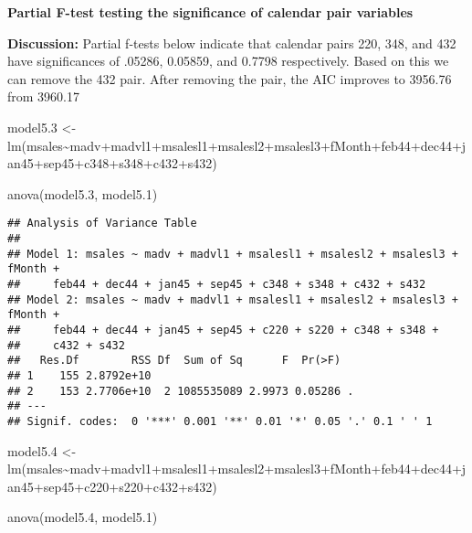 \documentclass[
]{article}
\newenvironment{Shaded}{\begin{snugshade}}{\end{snugshade}}
\newcommand{\FloatTok}[1]{\textcolor[rgb]{0.00,0.00,0.81}{#1}}
\newcommand{\FunctionTok}[1]{\textcolor[rgb]{0.00,0.00,0.00}{#1}}
\newcommand{\NormalTok}[1]{#1}
\newcommand{\OtherTok}[1]{\textcolor[rgb]{0.56,0.35,0.01}{#1}}
\newcommand{\SpecialCharTok}[1]{\textcolor[rgb]{0.00,0.00,0.00}{#1}}
\begin{document}
\textbf{Partial F-test testing the significance of calendar pair
variables}

\textbf{Discussion:} Partial f-tests below indicate that calendar pairs
220, 348, and 432 have significances of .05286, 0.05859, and 0.7798
respectively. Based on this we can remove the 432 pair. After removing
the pair, the AIC improves to 3956.76 from 3960.17

\begin{Shaded}
\begin{Highlighting}[]
\NormalTok{model5}\FloatTok{.3} \OtherTok{\textless{}{-}} \FunctionTok{lm}\NormalTok{(msales}\SpecialCharTok{\textasciitilde{}}\NormalTok{madv}\SpecialCharTok{+}\NormalTok{madvl1}\SpecialCharTok{+}\NormalTok{msalesl1}\SpecialCharTok{+}\NormalTok{msalesl2}\SpecialCharTok{+}\NormalTok{msalesl3}\SpecialCharTok{+}\NormalTok{fMonth}\SpecialCharTok{+}\NormalTok{feb44}\SpecialCharTok{+}\NormalTok{dec44}\SpecialCharTok{+}\NormalTok{jan45}\SpecialCharTok{+}\NormalTok{sep45}\SpecialCharTok{+}\NormalTok{c348}\SpecialCharTok{+}\NormalTok{s348}\SpecialCharTok{+}\NormalTok{c432}\SpecialCharTok{+}\NormalTok{s432)}

\FunctionTok{anova}\NormalTok{(model5}\FloatTok{.3}\NormalTok{, model5}\FloatTok{.1}\NormalTok{)}
\end{Highlighting}
\end{Shaded}

\begin{verbatim}
## Analysis of Variance Table
## 
## Model 1: msales ~ madv + madvl1 + msalesl1 + msalesl2 + msalesl3 + fMonth + 
##     feb44 + dec44 + jan45 + sep45 + c348 + s348 + c432 + s432
## Model 2: msales ~ madv + madvl1 + msalesl1 + msalesl2 + msalesl3 + fMonth + 
##     feb44 + dec44 + jan45 + sep45 + c220 + s220 + c348 + s348 + 
##     c432 + s432
##   Res.Df        RSS Df  Sum of Sq      F  Pr(>F)  
## 1    155 2.8792e+10                               
## 2    153 2.7706e+10  2 1085535089 2.9973 0.05286 .
## ---
## Signif. codes:  0 '***' 0.001 '**' 0.01 '*' 0.05 '.' 0.1 ' ' 1
\end{verbatim}

\begin{Shaded}
\begin{Highlighting}[]
\NormalTok{model5}\FloatTok{.4} \OtherTok{\textless{}{-}} \FunctionTok{lm}\NormalTok{(msales}\SpecialCharTok{\textasciitilde{}}\NormalTok{madv}\SpecialCharTok{+}\NormalTok{madvl1}\SpecialCharTok{+}\NormalTok{msalesl1}\SpecialCharTok{+}\NormalTok{msalesl2}\SpecialCharTok{+}\NormalTok{msalesl3}\SpecialCharTok{+}\NormalTok{fMonth}\SpecialCharTok{+}\NormalTok{feb44}\SpecialCharTok{+}\NormalTok{dec44}\SpecialCharTok{+}\NormalTok{jan45}\SpecialCharTok{+}\NormalTok{sep45}\SpecialCharTok{+}\NormalTok{c220}\SpecialCharTok{+}\NormalTok{s220}\SpecialCharTok{+}\NormalTok{c432}\SpecialCharTok{+}\NormalTok{s432)}

\FunctionTok{anova}\NormalTok{(model5}\FloatTok{.4}\NormalTok{, model5}\FloatTok{.1}\NormalTok{)}
\end{Highlighting}
\end{Shaded}
\end{document}
